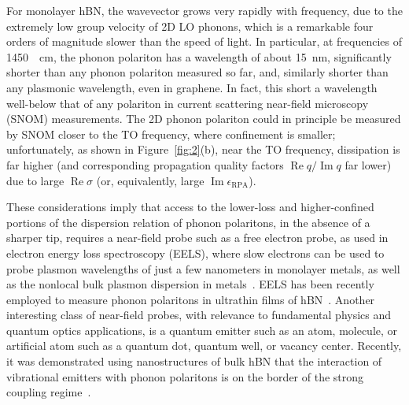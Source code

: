 \documentclass[aps,prb,twocolumn,
	           groupedaddress,superscriptaddress,
               amsfonts,amssymb,amsmath,floatfix,
	           citeautoscript]{revtex4-1}
\renewcommand{\Im}{\operatorname{Im}}
\renewcommand{\Re}{\operatorname{Re}}
\begin{document}
For monolayer hBN, the wavevector grows very rapidly with frequency, due to the extremely low group velocity of 2D LO phonons, which is a remarkable four orders of magnitude slower than the speed of light. In particular, at frequencies of \SI{1450}{\per\cm}, the phonon polariton has a wavelength of about \SI{15}{\nm}, significantly shorter than any phonon polariton measured so far, and, similarly shorter than any plasmonic wavelength, even in graphene. In fact, this short a wavelength well-below that of any polariton in current scattering near-field microscopy (SNOM) measurements. The 2D phonon polariton could in principle be measured by SNOM closer to the TO frequency, where confinement is smaller; unfortunately, as shown in Figure~\ref{fig:2}(b), near the TO frequency, dissipation is far higher (and corresponding propagation quality factors $\Re q/\Im q$ far lower) due to large $\Re\sigma$ (or, equivalently, large $\Im\epsilon_{\mathrm{RPA}}$).

These considerations imply that access to the lower-loss and higher-confined portions of the dispersion relation of phonon polaritons, in the absence of a sharper tip, requires a near-field probe such as a free electron probe, as used in electron energy loss spectroscopy (EELS), where slow electrons can be used to probe plasmon wavelengths of just a few nanometers in monolayer metals, as well as the nonlocal bulk plasmon dispersion in metals~\cite{nagao2001dispersion,de2010optical,diaconescu2007low}.
EELS has been recently employed to measure phonon polaritons in ultrathin films of hBN~\cite{govyadinov2017probing}. Another interesting class of near-field probes, with relevance to fundamental physics and quantum optics applications, is a quantum emitter such as an atom, molecule, or artificial atom such as a quantum dot, quantum well, or vacancy center. Recently, it was demonstrated using nanostructures of bulk hBN that the interaction of vibrational emitters with phonon polaritons is on the border of the strong coupling regime~\cite{autore2018boron}.
\end{document}
